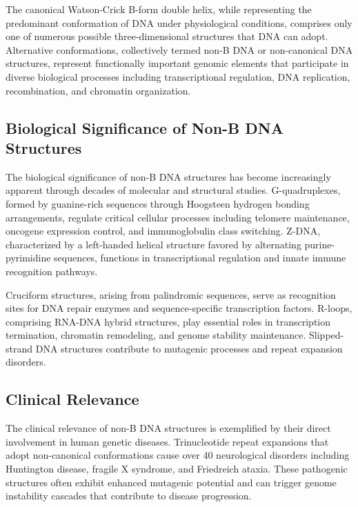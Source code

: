 \documentclass[twocolumn,letterpaper]{article}
\begin{document}
The canonical Watson-Crick B-form double helix, while representing the predominant conformation of DNA under physiological conditions, comprises only one of numerous possible three-dimensional structures that DNA can adopt. Alternative conformations, collectively termed non-B DNA or non-canonical DNA structures, represent functionally important genomic elements that participate in diverse biological processes including transcriptional regulation, DNA replication, recombination, and chromatin organization\cite{Wells2007}.

\subsection{Biological Significance of Non-B DNA Structures}

The biological significance of non-B DNA structures has become increasingly apparent through decades of molecular and structural studies. G-quadruplexes, formed by guanine-rich sequences through Hoogsteen hydrogen bonding arrangements, regulate critical cellular processes including telomere maintenance, oncogene expression control, and immunoglobulin class switching\cite{Sen1988,Maizels2015}. Z-DNA, characterized by a left-handed helical structure favored by alternating purine-pyrimidine sequences, functions in transcriptional regulation and innate immune recognition pathways\cite{Rich2003}.

Cruciform structures, arising from palindromic sequences, serve as recognition sites for DNA repair enzymes and sequence-specific transcription factors. R-loops, comprising RNA-DNA hybrid structures, play essential roles in transcription termination, chromatin remodeling, and genome stability maintenance\cite{Ginno2012,Aguilera2012}. Slipped-strand DNA structures contribute to mutagenic processes and repeat expansion disorders\cite{Mirkin2007}.

\subsection{Clinical Relevance}

The clinical relevance of non-B DNA structures is exemplified by their direct involvement in human genetic diseases. Trinucleotide repeat expansions that adopt non-canonical conformations cause over 40 neurological disorders including Huntington disease, fragile X syndrome, and Friedreich ataxia\cite{Wang2014}. These pathogenic structures often exhibit enhanced mutagenic potential and can trigger genome instability cascades that contribute to disease progression.
\end{document}

